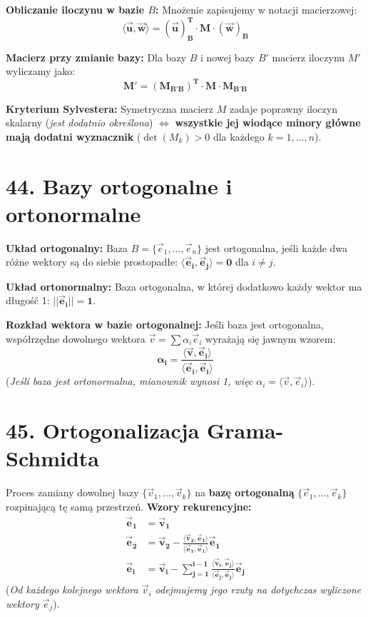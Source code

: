 \documentclass[12pt,a4paper]{article}
\begin{document}
\noindent\textbf{Obliczanie iloczynu w bazie $B$:} Mnożenie zapisujemy w notacji macierzowej:
$$ \mathbf{\langle \vec{u}, \vec{w} \rangle = (\vec{u})_B^T \cdot M \cdot (\vec{w})_B} $$

\noindent\textbf{Macierz przy zmianie bazy:} Dla bazy $B$ i nowej bazy $B'$ macierz iloczynu $M'$ wyliczamy jako:
$$ \mathbf{M' = (M_{B'B})^T \cdot M \cdot M_{B'B}} $$

\noindent\textbf{Kryterium Sylvestera:} Symetryczna macierz $M$ zadaje poprawny iloczyn skalarny (\textit{jest dodatnio określona}) $\iff$ \textbf{wszystkie jej wiodące minory główne mają dodatni wyznacznik} ($\det(M_k) > 0$ dla każdego $k=1,\dots,n$).

\section*{44. Bazy ortogonalne i ortonormalne}
\noindent\textbf{Układ ortogonalny:} Baza $B = \{\vec{e}_1, \dots, \vec{e}_n\}$ jest ortogonalna, jeśli każde dwa różne wektory są do siebie prostopadłe: $\mathbf{\langle \vec{e}_i, \vec{e}_j \rangle = 0}$ dla $i \neq j$.

\noindent\textbf{Układ ortonormalny:} Baza ortogonalna, w której dodatkowo każdy wektor ma długość 1: $\mathbf{||\vec{e}_i|| = 1}$.

\noindent\textbf{Rozkład wektora w bazie ortogonalnej:} Jeśli baza jest ortogonalna, współrzędne dowolnego wektora $\vec{v} = \sum \alpha_i \vec{e}_i$ wyrażają się jawnym wzorem:
$$ \mathbf{\alpha_i = \frac{\langle \vec{v}, \vec{e}_i \rangle}{\langle \vec{e}_i, \vec{e}_i \rangle}} $$
(\textit{Jeśli baza jest ortonormalna, mianownik wynosi 1, więc $\alpha_i = \langle \vec{v}, \vec{e}_i \rangle$}).

\section*{45. Ortogonalizacja Grama-Schmidta}
Proces zamiany dowolnej bazy $\{\vec{v}_1, \dots, \vec{v}_k\}$ na \textbf{bazę ortogonalną} $\{\vec{e}_1, \dots, \vec{e}_k\}$ rozpinającą tę samą przestrzeń.
\noindent\textbf{Wzory rekurencyjne:}
\begin{align*}
    \mathbf{\vec{e}_1} &\mathbf{= \vec{v}_1} \\
    \mathbf{\vec{e}_2} &\mathbf{= \vec{v}_2 - \frac{\langle \vec{v}_2, \vec{e}_1 \rangle}{\langle \vec{e}_1, \vec{e}_1 \rangle} \vec{e}_1} \\
    \mathbf{\vec{e}_i} &\mathbf{= \vec{v}_i - \sum_{j=1}^{i-1} \frac{\langle \vec{v}_i, \vec{e}_j \rangle}{\langle \vec{e}_j, \vec{e}_j \rangle} \vec{e}_j}
\end{align*}
(\textit{Od każdego kolejnego wektora $\vec{v}_i$ odejmujemy jego rzuty na dotychczas wyliczone wektory $\vec{e}_j$}).
\end{document}
